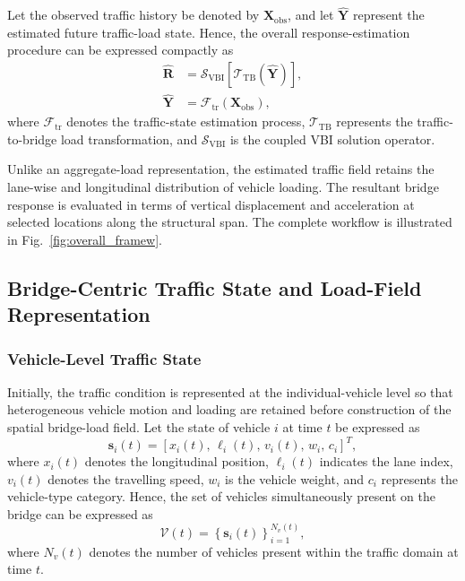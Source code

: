 \documentclass[journal]{IEEEtran}
\begin{document}
Let the observed traffic history be denoted by $\mathbf{X}_{\mathrm{obs}}$, and let $\widehat{\mathbf{Y}}$ represent the estimated future traffic-load state. Hence, the overall response-estimation procedure can be expressed compactly as
\begin{equation}
\begin{aligned}
\widehat{\mathbf{R}}&=\mathcal{S}_{\mathrm{VBI}}\left[\mathcal{T}_{\mathrm{TB}}\left(\widehat{\mathbf{Y}}\right)\right],\\
\widehat{\mathbf{Y}}&=\mathcal{F}_{\mathrm{tr}}\left(\mathbf{X}_{\mathrm{obs}}\right),
\end{aligned}
\label{eq:overall_framework}
\end{equation}
where $\mathcal{F}_{\mathrm{tr}}$ denotes the traffic-state estimation process, $\mathcal{T}_{\mathrm{TB}}$ represents the traffic-to-bridge load transformation, and $\mathcal{S}_{\mathrm{VBI}}$ is the coupled VBI solution operator.

Unlike an aggregate-load representation, the estimated traffic field retains the lane-wise and longitudinal distribution of vehicle loading. The resultant bridge response is evaluated in terms of vertical displacement and acceleration at selected locations along the structural span. The complete workflow is illustrated in Fig.~\ref{fig:overall_framew}.

\subsection{Bridge-Centric Traffic State and Load-Field Representation}
\label{sec:traffic_state_representation}
\subsubsection{Vehicle-Level Traffic State}
\label{subsec:vehicle_state}

Initially, the traffic condition is represented at the individual-vehicle level so that heterogeneous vehicle motion and loading are retained before construction of the spatial bridge-load field. Let the state of vehicle $i$ at time $t$ be expressed as
\begin{equation}
\mathbf{s}_{i}(t)=\left[x_i(t),\,\ell_i(t),\,v_i(t),\,w_i,\,c_i\right]^{T},
\label{eq:vehicle_state}
\end{equation}
where $x_i(t)$ denotes the longitudinal position, $\ell_i(t)$ indicates the lane index, $v_i(t)$ denotes the travelling speed, $w_i$ is the vehicle weight, and $c_i$ represents the vehicle-type category. Hence, the set of vehicles simultaneously present on the bridge can be expressed as
\begin{equation}
\mathcal{V}(t)=\left\{\mathbf{s}_{i}(t)\right\}_{i=1}^{N_v(t)},
\label{eq:vehicle_set}
\end{equation}
where $N_v(t)$ denotes the number of vehicles present within the traffic domain at time $t$.
\end{document}
